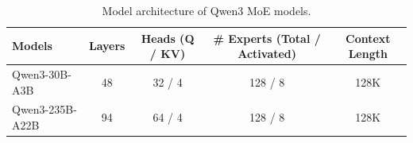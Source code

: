 \begin{table}[htbp]
\caption{Model architecture of Qwen3 MoE models.\label{tab:arch-moe}}
\small
\centering
\begin{tabular}{@{}lcccc@{}} 
\toprule
Models  & Layers & Heads (Q / KV) & \# Experts (Total / Activated) & Context Length  \\
\midrule
Qwen3-30B-A3B  & 48 & 32 / 4 &128 / 8  & 128K   \\
Qwen3-235B-A22B  & 94 & 64 / 4 &128 / 8  & 128K  \\
\bottomrule
\end{tabular}
\end{table}
